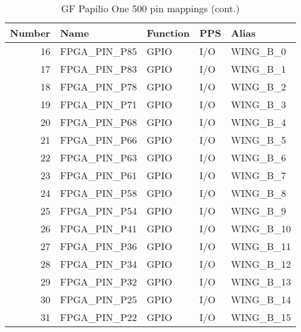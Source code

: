 \begin{table}[H]
\begin{center}
\begin{tabularx}{14cm}{rlllX}
Number & Name & Function & PPS & Alias \\
\hline
16 &FPGA\_PIN\_P85 & GPIO & I/O & WING\_B\_0 \\
17 &FPGA\_PIN\_P83 & GPIO & I/O & WING\_B\_1 \\
18 &FPGA\_PIN\_P78 & GPIO & I/O & WING\_B\_2 \\
19 &FPGA\_PIN\_P71 & GPIO & I/O & WING\_B\_3 \\
20 &FPGA\_PIN\_P68 & GPIO & I/O & WING\_B\_4 \\
21 &FPGA\_PIN\_P66 & GPIO & I/O & WING\_B\_5 \\
22 &FPGA\_PIN\_P63 & GPIO & I/O & WING\_B\_6 \\
23 &FPGA\_PIN\_P61 & GPIO & I/O & WING\_B\_7 \\
24 &FPGA\_PIN\_P58 & GPIO & I/O & WING\_B\_8 \\
25 &FPGA\_PIN\_P54 & GPIO & I/O & WING\_B\_9 \\
26 &FPGA\_PIN\_P41 & GPIO & I/O & WING\_B\_10 \\
27 &FPGA\_PIN\_P36 & GPIO & I/O & WING\_B\_11 \\
28 &FPGA\_PIN\_P34 & GPIO & I/O & WING\_B\_12 \\
29 &FPGA\_PIN\_P32 & GPIO & I/O & WING\_B\_13 \\
30 &FPGA\_PIN\_P25 & GPIO & I/O & WING\_B\_14 \\
31 &FPGA\_PIN\_P22 & GPIO & I/O & WING\_B\_15
\end{tabularx}
\caption{GF Papilio One 500 pin mappings (cont.)}
\end{center}
\end{table}

